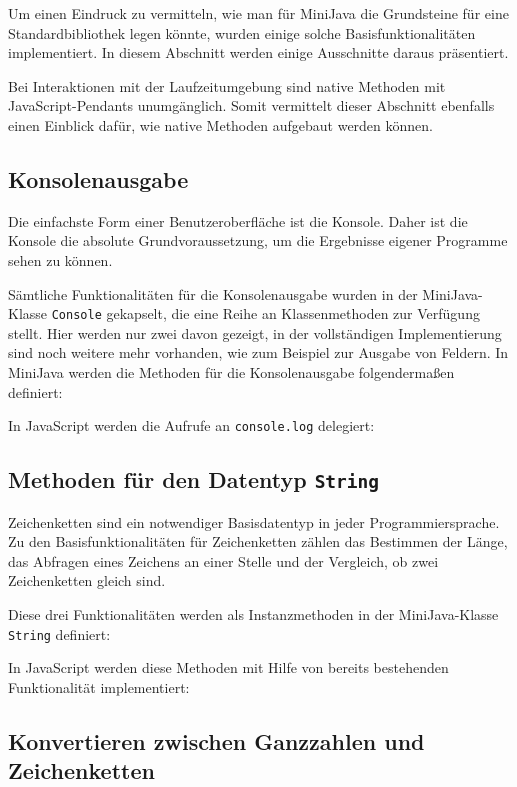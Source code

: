 Um einen Eindruck zu vermitteln, wie man für MiniJava die Grundsteine für eine Standardbibliothek legen könnte, wurden einige solche Basisfunktionalitäten implementiert. In diesem Abschnitt werden einige Ausschnitte daraus präsentiert.

Bei Interaktionen mit der Laufzeitumgebung sind native Methoden mit JavaScript-Pendants unumgänglich. Somit vermittelt dieser Abschnitt ebenfalls einen Einblick dafür, wie native Methoden aufgebaut werden können.

\subsection{Konsolenausgabe}
Die einfachste Form einer Benutzeroberfläche ist die Konsole. Daher ist die Konsole die absolute Grundvoraussetzung, um die Ergebnisse eigener Programme sehen zu können.

Sämtliche Funktionalitäten für die Konsolenausgabe wurden in der MiniJava-Klasse \lstinline{Console} gekapselt, die eine Reihe an Klassenmethoden zur Verfügung stellt. Hier werden nur zwei davon gezeigt, in der vollständigen Implementierung sind noch weitere mehr vorhanden, wie zum Beispiel zur Ausgabe von Feldern. In MiniJava werden die Methoden für die Konsolenausgabe folgendermaßen definiert:


In JavaScript werden die Aufrufe an \lstinline{console.log} delegiert:


\subsection{Methoden für den Datentyp \lstinline{String}}

Zeichenketten sind ein notwendiger Basisdatentyp in jeder Programmiersprache. Zu den Basisfunktionalitäten für Zeichenketten zählen das Bestimmen der Länge, das Abfragen eines Zeichens an einer Stelle und der Vergleich, ob zwei Zeichenketten gleich sind.

Diese drei Funktionalitäten werden als Instanzmethoden in der MiniJava-Klasse \lstinline{String} definiert:


In JavaScript werden diese Methoden mit Hilfe von bereits bestehenden Funktionalität implementiert:


\subsection{Konvertieren zwischen Ganzzahlen und Zeichenketten}

